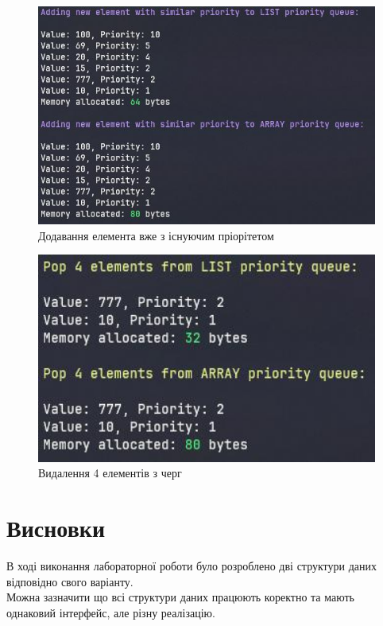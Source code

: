 \begin{figure}[h!]
  \centering
  \includegraphics[width=15cm]{reports/algos/lab7/assets/3.jpeg}
  \caption{Додавання елемента вже з існуючим пріорітетом}
\end{figure}

\begin{figure}[h!]
  \centering
  \includegraphics[width=15cm]{reports/algos/lab7/assets/4.jpeg}
  \caption{Видалення 4 елементів з черг}
\end{figure}

\clearpage
\section{Висновки}
  В ході виконання лабораторної роботи було розроблено дві структури даних відповідно свого
варіанту.\\

  Можна зазначити що всі структури даних працюють коректно та мають однаковий інтерфейс,
але різну реалізацію.\\

